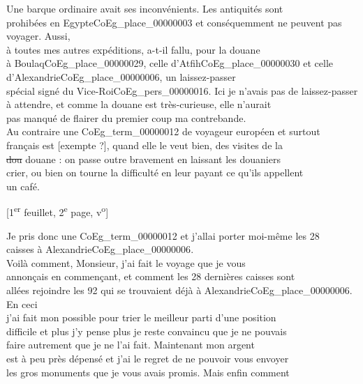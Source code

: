 \documentclass{book}
\begin{document}
\indent Une barque ordinaire avait ses inconvénients. Les antiquités sont\\
prohibées en Egypte\gls{CoEg_place_00000003} et conséquemment ne peuvent pas voyager. Aussi,\\
à toutes mes autres expéditions, a-t-il fallu, pour la douane\\
à Boulaq\gls{CoEg_place_00000029}, celle d’Atfih\gls{CoEg_place_00000030} et celle d’Alexandrie\gls{CoEg_place_00000006}, un laissez-passer\\
spécial signé du Vice-Roi\gls{CoEg_pers_00000016}. Ici je n’avais pas de laissez-passer\\
à attendre, et comme la douane est très-curieuse, elle n’aurait\\
pas manqué de flairer du premier coup ma contrebande.\\
\indent Au contraire une \gls{CoEg_term_00000012} de voyageur européen et surtout\\
français est {[exempte ?]}, quand elle le veut bien, des visites de la\\
\sout{dou} douane : on passe outre bravement en laissant les douaniers\\
crier, ou bien on tourne la difficulté en leur payant ce qu’ils appellent\\
un café.
{\footnotesize\begin{center} {[1\textsuperscript{er} feuillet, 2\textsuperscript{e} page, v\textsuperscript{o}]}\end{center}}
\indent Je pris donc une \gls{CoEg_term_00000012} et j’allai porter moi-même les 28\\
caisses à Alexandrie\gls{CoEg_place_00000006}.\\
\indent Voilà comment, Monsieur, j’ai fait le voyage que je vous\\
annonçais en commençant, et comment les 28 dernières caisses sont\\
allées rejoindre les 92 qui se trouvaient déjà à Alexandrie\gls{CoEg_place_00000006}. En ceci\\
j’ai fait mon possible pour trier le meilleur parti d’une position\\
difficile et plus j’y pense plus je reste convaincu que je ne pouvais\\
faire autrement que je ne l’ai fait. Maintenant mon argent\\
est à peu près dépensé et j’ai le regret de ne pouvoir vous envoyer\\
les gros monuments que je vous avais promis. Mais enfin comment\\
\end{document}
